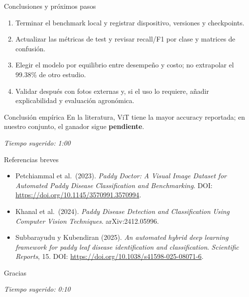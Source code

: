 \documentclass[aspectratio=169,11pt]{beamer}
\newcommand{\tiempo}[1]{\vfill\hfill\scriptsize\textit{Tiempo sugerido: #1}}
\newcommand{\pendiente}{\textcolor{arrozoro}{\textbf{pendiente}}}
\begin{document}
\begin{frame}{Conclusiones y próximos pasos}
    \begin{enumerate}
        \item Terminar el benchmark local y registrar dispositivo, versiones y checkpoints.
        \item Actualizar las métricas de test y revisar recall/F1 por clase y matrices de confusión.
        \item Elegir el modelo por equilibrio entre desempeño y costo; no extrapolar el 99.38\% de otro estudio.
        \item Validar después con fotos externas y, si el uso lo requiere, añadir explicabilidad y evaluación agronómica.
    \end{enumerate}
    \begin{block}{Conclusión empírica}
        En la literatura, ViT tiene la mayor accuracy reportada; en nuestro conjunto, el ganador sigue \pendiente.
    \end{block}
    \tiempo{1:00}
\end{frame}

\begin{frame}{Referencias breves}
    \footnotesize
    \begin{itemize}
        \item Petchiammal et al.\ (2023). \emph{Paddy Doctor: A Visual Image Dataset for Automated Paddy Disease Classification and Benchmarking}. DOI: \url{https://doi.org/10.1145/3570991.3570994}.
        \item Khanal et al.\ (2024). \emph{Paddy Disease Detection and Classification Using Computer Vision Techniques}. arXiv:2412.05996.
        \item Subbarayudu y Kubendiran (2025). \emph{An automated hybrid deep learning framework for paddy leaf disease identification and classification}. \emph{Scientific Reports}, 15. DOI: \url{https://doi.org/10.1038/s41598-025-08071-6}.
    \end{itemize}
    \begin{center}
        \large Gracias
    \end{center}
    \tiempo{0:10}
\end{frame}
\end{document}
